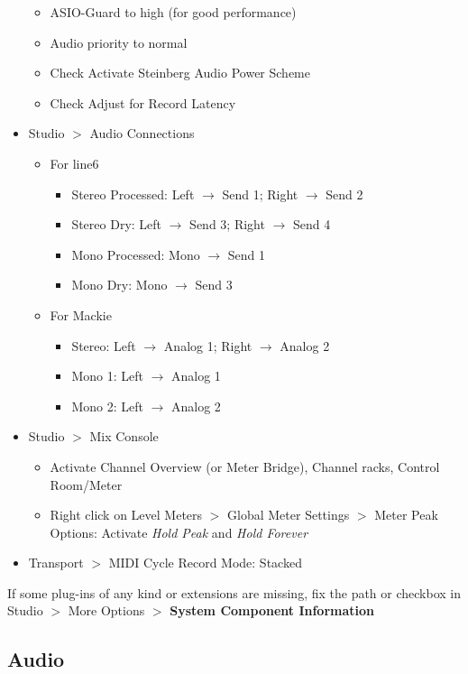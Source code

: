 \documentclass[10pt]{article}
\begin{document}
\begin{itemize}
\begin{itemize}
		\item ASIO-Guard to high (for good performance)
		\item Audio priority to normal
		\item Check Activate Steinberg Audio Power Scheme
		\item Check Adjust for Record Latency
	\end{itemize}
	\item Studio $>$ Audio Connections
	\begin{itemize}
		\item For line6
		\begin{itemize}
			\item Stereo Processed: Left $\rightarrow$ Send 1; Right $\rightarrow$ Send 2
			\item Stereo Dry: Left $\rightarrow$ Send 3; Right $\rightarrow$ Send 4
			\item Mono Processed: Mono $\rightarrow$ Send 1
			\item Mono Dry: Mono $\rightarrow$ Send 3
		\end{itemize}
		\item For Mackie
		\begin{itemize}
			\item Stereo: Left $\rightarrow$ Analog 1; Right $\rightarrow$ Analog 2
			\item Mono 1: Left $\rightarrow$ Analog 1
			\item Mono 2: Left $\rightarrow$ Analog 2
		\end{itemize}
	\end{itemize}
	\item Studio $>$ Mix Console
	\begin{itemize}
		\item Activate Channel Overview (or Meter Bridge), Channel racks, Control Room/Meter
		\item Right click on Level Meters $>$ Global Meter Settings $>$ Meter Peak Options: Activate \textit{Hold Peak} and \textit{Hold Forever}
	\end{itemize}
	\item Transport $>$ MIDI Cycle Record Mode: Stacked
\end{itemize}

If some plug-ins of any kind or extensions are missing, fix the path or checkbox in Studio $>$ More Options $>$ \textbf{System Component Information}

\subsection{Audio}\label{AudioQuality}
\end{document}
